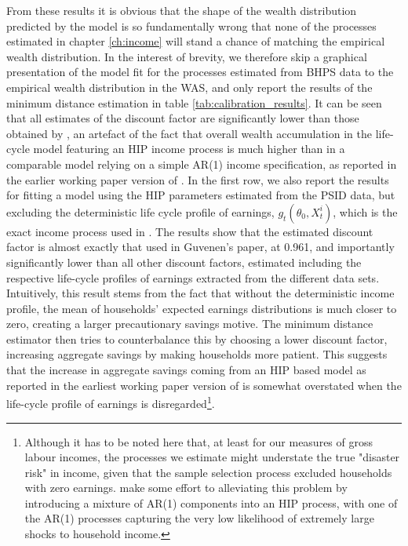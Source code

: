 From these results
it is obvious that the shape of the wealth distribution predicted by the model
is so fundamentally wrong that none of the processes estimated in chapter 
\ref{ch:income} will stand a chance of matching the empirical wealth distribution.
In the interest of brevity, we therefore skip a graphical presentation of the model
fit for the processes estimated from BHPS data to the empirical wealth distribution
in the WAS, and only report the results of the minimum distance estimation in 
table \ref{tab:calibration_results}. It can be seen that all estimates of the 
discount factor are significantly lower than those obtained by \citet{HintermaierKoeniger2011},
an artefact of the fact that overall wealth accumulation in the life-cycle model
featuring an HIP income process is much higher than in a comparable model 
relying on a simple AR(1) income specification, as reported in the earlier 
working paper version of \citet{Guvenen2007}. In the first row, we also report 
the results for fitting a model using the HIP parameters estimated from the PSID
data, but excluding the deterministic life cycle profile of earnings, 
$g_t(\theta_0, X_t^i)$, which is the exact income process used in \citet{Guvenen2007}.
The results show that the estimated discount factor is almost exactly that 
used in Guvenen's paper, at 0.961, and importantly significantly lower than 
all other discount factors, estimated including the respective life-cycle profiles
of earnings extracted from the different data sets. Intuitively, this result
stems from the fact that without the deterministic income profile, the mean 
of households' expected earnings distributions is much closer to zero, creating
a larger precautionary savings motive. The minimum distance estimator then tries
to counterbalance this by choosing a lower discount factor, increasing aggregate
savings by making households more patient. This suggests that the increase in 
aggregate savings coming from an HIP based model as reported in the earliest 
working paper version of \citet{Guvenen2007} is somewhat overstated when 
the life-cycle profile of earnings is disregarded\footnote{Although it has to 
be noted here that, at least for our measures of gross labour incomes, the processes
we estimate might understate the true "disaster risk" in income, given that the 
sample selection process excluded households with zero earnings. \citet{GKOS2015}
make some effort to alleviating this problem by introducing a mixture of AR(1)
components into an HIP process, with one of the AR(1) processes capturing the 
very low likelihood of extremely large shocks to household income.}. 

